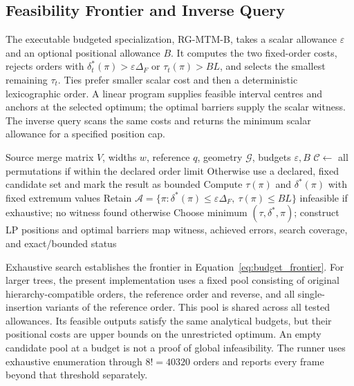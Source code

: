 \subsection{Feasibility Frontier and Inverse Query}\label{sec:hard_budget}
The executable budgeted specialization, RG-MTM-B, takes a scalar allowance $\varepsilon$ and an optional positional allowance $B$. It computes the two fixed-order costs, rejects orders with $\delta_t^*(\pi)>\varepsilon\Delta_F$ or $\tau_t(\pi)>BL$, and selects the smallest remaining $\tau_t$. Ties prefer smaller scalar cost and then a deterministic lexicographic order. A linear program supplies feasible interval centres and anchors at the selected optimum; the optimal barriers supply the scalar witness. The inverse query scans the same costs and returns the minimum scalar allowance for a specified position cap.

\begin{algorithm}[t]
\caption{Budgeted reference specialization, per frame}\label{alg:budgeted}
\begin{algorithmic}[1]
\Require Source merge matrix $V$, widths $w$, reference $q$, geometry $\mathcal G$, budgets $\varepsilon,B$
\State $\mathcal C\gets$ all permutations if within the declared order limit
\State Otherwise use a declared, fixed candidate set and mark the result as bounded
 \State Compute $\tau(\pi)$ and $\delta^*(\pi)$ with fixed extremum values
\EndFor
\State Retain $\mathcal A=\{\pi:\delta^*(\pi)\le\varepsilon\Delta_F,\ \tau(\pi)\le BL\}$
 \State \Return infeasible if exhaustive; no witness found otherwise
\EndIf
\State Choose minimum $(\tau,\delta^*,\pi)$; construct LP positions and optimal barriers
\State \Return map witness, achieved errors, search coverage, and exact/bounded status
\end{algorithmic}
\end{algorithm}
Exhaustive search establishes the frontier in Equation~\eqref{eq:budget_frontier}. For larger trees, the present implementation uses a fixed pool consisting of original hierarchy-compatible orders, the reference order and reverse, and all single-insertion variants of the reference order. This pool is shared across all tested allowances. Its feasible outputs satisfy the same analytical budgets, but their positional costs are upper bounds on the unrestricted optimum. An empty candidate pool at a budget is not a proof of global infeasibility. The runner uses exhaustive enumeration through $8!=40320$ orders and reports every frame beyond that threshold separately.

